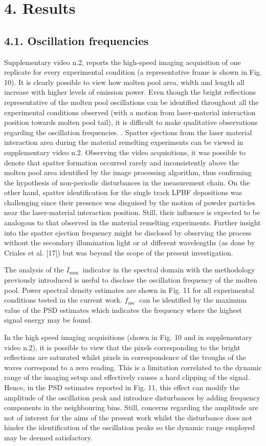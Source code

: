 \documentclass[10pt]{article}
\begin{document}
\section*{4. Results}
\subsection*{4.1. Oscillation frequencies}
Supplementary video n.2, reports the high-speed imaging acquisition of one replicate for every experimental condition (a representative frame is shown in Fig. 10). It is clearly possible to view how molten pool area, width and length all increase with higher levels of emission power. Even though the bright reflections representative of the molten pool oscillations can be identified throughout all the experimental conditions observed (with a motion from laser-material interaction position towards molten pool tail), it is difficult to make qualitative observations regarding the oscillation frequencies. . Spatter ejections from the laser material interaction area during the material remelting experiments can be viewed in supplementary video n.2. Observing the video acquisitions, it was possible to denote that spatter formation occurred rarely and inconsistently above the molten pool area identified by the image processing algorithm, thus confirming the hypothesis of non-periodic disturbances in the measurement chain. On the other hand, spatter identification for the single track LPBF depositions was challenging since their presence was disguised by the motion of powder particles near the laser-material interaction position. Still, their influence is expected to be analogous to that observed in the material remelting experiments. Further insight into the spatter ejection frequency might be disclosed by observing the process without the secondary illumination light or at different wavelengths (as done by Criales et al. [17]) but was beyond the scope of the present investigation.

The analysis of the $I_{\text {sum }}$ indicator in the spectral domain with the methodology previously introduced is useful to disclose the oscillation frequency of the molten pool. Power spectral density estimates are shown in Fig. 11 for all experimental conditions tested in the current work. $f_{\text {osc }}$ can be identified by the maximum value of the PSD estimates which indicates the frequency where the highest signal energy may be found.

In the high speed imaging acquisitions (shown in Fig. 10 and in supplementary video n.2), it is possible to view that the pixels corresponding to the bright reflections are saturated whilst pixels in correspondence of the troughs of the waves correspond to a zero reading. This is a limitation correlated to the dynamic range of the imaging setup and effectively causes a hard clipping of the signal. Hence, in the PSD estimates reported in Fig. 11, this effect can modify the amplitude of the oscillation peak and introduce disturbances by adding frequency components in the neighbouring bins. Still, concerns regarding the amplitude are not of interest for the aims of the present work whilst the disturbance does not hinder the identification of the oscillation peaks so the dynamic range employed may be deemed satisfactory.
\end{document}
